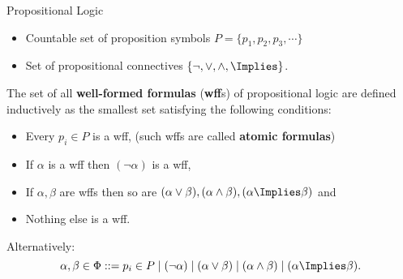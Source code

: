 \documentclass[xcolor=dvipsnames]{beamer}
\begin{document}
\begin{frame}{Propositional Logic}
\begin{itemize}
\item Countable set of proposition symbols $P=\{p_1,p_2,p_3,\cdots\}$
\item Set of propositional connectives $\{\lnot,\lor,\land,\Implies\}$. 
\end{itemize}
\pause
The set of all {\bf well-formed formulas} ({\bf wff}s) of propositional logic are defined inductively as the smallest set satisfying the following conditions:
\begin{itemize}
\item Every $p_i \in P$ is a wff, (such wffs are called {\bf atomic formulas})
\item If $\alpha$ is a wff then $(\lnot \alpha)$ is a wff,
\item If $\alpha,\beta$ are wffs then so are $(\alpha \lor \beta),(\alpha \land \beta),(\alpha \Implies \beta)$ and
\item Nothing else is a wff.
\end{itemize}
\pause
Alternatively:
\[\alpha,\beta \in \Phi::= p_i\in P \mid (\lnot \alpha) \mid (\alpha \lor \beta) \mid (\alpha \land \beta)\mid (\alpha \Implies \beta).\]
\end{frame}
\end{document}
